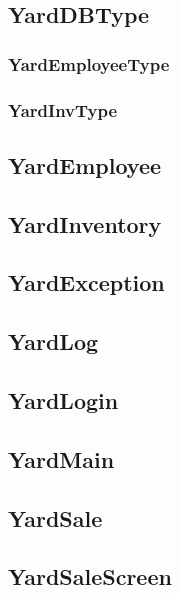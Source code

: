 \documentclass{report}
\begin{document}
    \subsection{YardDBType}

    \subsubsection{YardEmployeeType}

    \subsubsection{YardInvType}


    \subsection{YardEmployee}

    \subsection{YardInventory}

    \subsection{YardException}

    \subsection{YardLog}

    \subsection{YardLogin}

    \subsection{YardMain}

    \subsection{YardSale}

    \subsection{YardSaleScreen}
\end{document}

